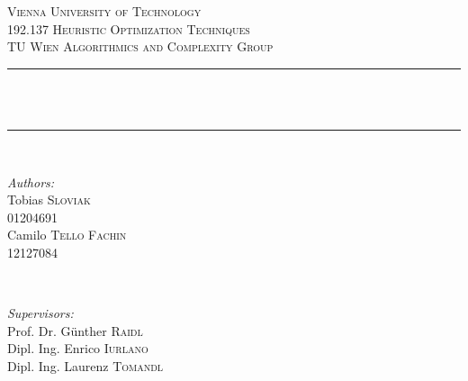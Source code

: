 \begin{titlepage}

\newcommand{\HRule}{\rule{\linewidth}{0.5mm}} %

\center %
 

\textsc{\LARGE Vienna University of Technology}\\[1.5cm] %
\textsc{\Large 192.137 Heuristic Optimization Techniques}\\[0.5cm] %
\textsc{\large TU Wien Algorithmics and Complexity Group}\\[0.5cm] %


\HRule \\[0.5cm]
{ \huge \bfseries \doctitle}\\[1mm] %
\HRule \\[0.5cm]
 
\hfill

\begin{minipage}{0.58\textwidth}
\begin{flushleft} \large
\emph{Authors:}\\
\null
Tobias \textsc{Sloviak}\\
01204691 \\
\null
Camilo \textsc{Tello Fachin}\\
12127084 \\

\end{flushleft}
\end{minipage}
~
\begin{minipage}{0.4\textwidth}
\begin{flushleft} \large
\emph{Supervisors:} \\
\null
Prof. Dr. Günther \textsc{Raidl} \\ %
\null
Dipl. Ing. Enrico \textsc{Iurlano} \\ %
\null
Dipl. Ing. Laurenz \textsc{Tomandl} \\ %
\null
\end{flushleft}
\end{minipage}\\[1.5cm]
\hfill


\end{titlepage}
